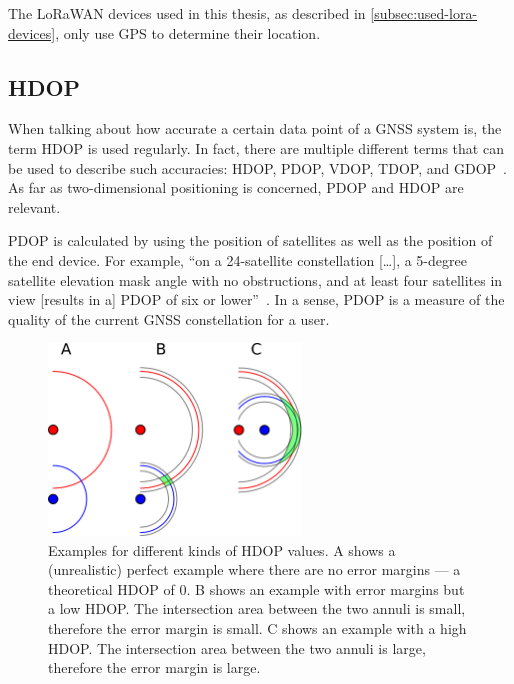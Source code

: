 The \ac{LoRaWAN} devices used in this thesis, as described in \cref{subsec:used-lora-devices}, only use \ac{GPS} to determine their location.

\subsection{\acf{HDOP}}

When talking about how accurate a certain data point of a \ac{GNSS} system is, the term \ac{HDOP} is used regularly.
In fact, there are multiple different terms that can be used to describe such accuracies: \ac{HDOP}, \ac{PDOP}, \ac{VDOP}, \ac{TDOP}, and \ac{GDOP}~\cite{langley_dilution_1999}.
As far as two-dimensional positioning is concerned, \ac{PDOP} and \ac{HDOP} are relevant.

\ac{PDOP} is calculated by using the position of satellites as well as the position of the end device.
For example, ``on a 24-satellite constellation […], a 5-degree satellite elevation mask angle with no obstructions, and at least four satellites in view [results in a] \acf{PDOP} of six or lower''~\cite{langley_dilution_1999}.
In a sense, \ac{PDOP} is a measure of the quality of the current \ac{GNSS} constellation for a user.

\begin{figure}[htbp]
    \centering
    \includegraphics[width=0.6\textwidth]{pictures/multilateration/Geometric_Dilution_Of_Precision.eps}
    \caption{
        Examples for different kinds of \ac{HDOP} values.
        A shows a (unrealistic) perfect example where there are no error margins --- a theoretical \ac{HDOP} of 0.
        B shows an example with error margins but a low \ac{HDOP}.
        The intersection area between the two annuli is small, therefore the error margin is small.
        C shows an example with a high \ac{HDOP}.
        The intersection area between the two annuli is large, therefore the error margin is large.\cite{xoneca_english_2013}
    }\label{pic:hdop-example-diagram}
\end{figure}

